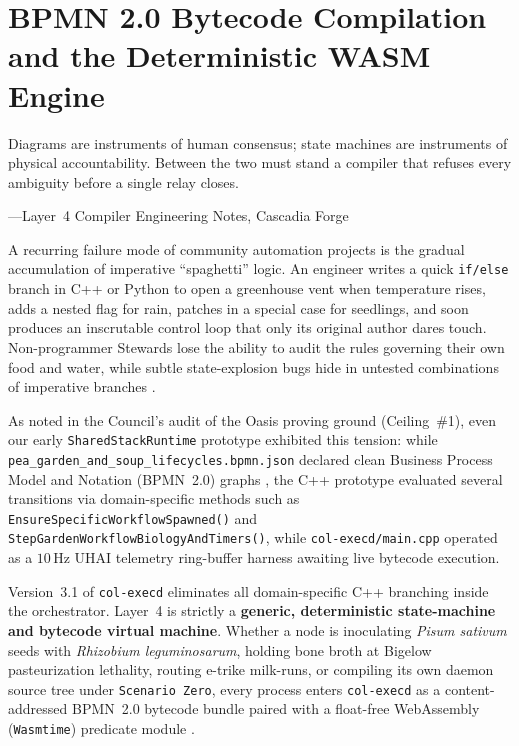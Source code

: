 \chapter{BPMN 2.0 Bytecode Compilation and the Deterministic WASM Engine}
\label{ch:wasm-engine}

\epigraph{Diagrams are instruments of human consensus; state machines are instruments of physical accountability. Between the two must stand a compiler that refuses every ambiguity before a single relay closes.}{---Layer~4 Compiler Engineering Notes, Cascadia Forge}

A recurring failure mode of community automation projects is the gradual accumulation of
imperative ``spaghetti'' logic. An engineer writes a quick \texttt{if/else} branch in C++ or
Python to open a greenhouse vent when temperature rises, adds a nested flag for rain,
patches in a special case for seedlings, and soon produces an inscrutable control loop that
only its original author dares touch. Non-programmer Stewards lose the ability to audit the
rules governing their own food and water, while subtle state-explosion bugs hide in untested
combinations of imperative branches
\parencite{harel1987statecharts,vanderaalst1998application}.

As noted in the Council's audit of the Oasis proving ground (Ceiling~\#1), even our early
\texttt{SharedStackRuntime} prototype exhibited this tension: while
\texttt{pea\_garden\_and\_soup\_lifecycles.bpmn.json} declared clean Business Process Model
and Notation (BPMN~2.0) graphs \parencite{omg2011bpmn,chinosi2012bpmn}, the C++ prototype
evaluated several transitions via domain-specific methods such as
\texttt{EnsureSpecificWorkflowSpawned()} and \texttt{StepGardenWorkflowBiologyAndTimers()},
while \texttt{col-execd/main.cpp} operated as a $10\,\mathrm{Hz}$ UHAI telemetry ring-buffer
harness awaiting live bytecode execution.

Version~3.1 of \texttt{col-execd} eliminates all domain-specific C++ branching inside the
orchestrator. Layer~4 is strictly a \textbf{generic, deterministic state-machine and
bytecode virtual machine}. Whether a node is inoculating \textit{Pisum sativum} seeds with
\textit{Rhizobium leguminosarum}, holding bone broth at Bigelow pasteurization lethality,
routing e-trike milk-runs, or compiling its own daemon source tree under \texttt{Scenario
Zero}, every process enters \texttt{col-execd} as a content-addressed BPMN~2.0 bytecode
bundle paired with a float-free WebAssembly (\texttt{Wasmtime}) predicate module
\parencite{haas2017wasm}.

